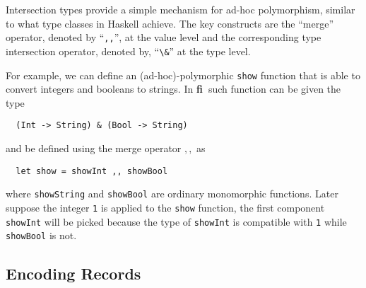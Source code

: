 \documentclass[preprint]{sigplanconf}
\newcommand{\name}{{\bf fi~}}
\begin{document}
Intersection types provide a simple mechanism for ad-hoc polymorphism, similar
to what type classes in Haskell achieve. The key constructs are the ``merge''
operator, denoted by ``\lstinline{,,}'', at the value level and the corresponding type
intersection operator, denoted by, ``\lstinline{\&}'' at the type level.

For example, we can define an (ad-hoc)-polymorphic \lstinline{show} function
that is able to convert integers and booleans to strings. In \name such function
can be given the type
\begin{lstlisting}
  (Int -> String) & (Bool -> String)
\end{lstlisting}
and be defined using the merge operator $ ,, $ as
\begin{lstlisting}
  let show = showInt ,, showBool
\end{lstlisting}
where \lstinline{showString} and \lstinline{showBool} are ordinary monomorphic
functions. Later suppose the integer \lstinline{1} is applied to the \lstinline{show} function,
the first component \lstinline{showInt} will be picked because the type of \lstinline{showInt}
is compatible with \lstinline{1} while \lstinline{showBool} is not.








\subsection{Encoding Records}
\end{document}
